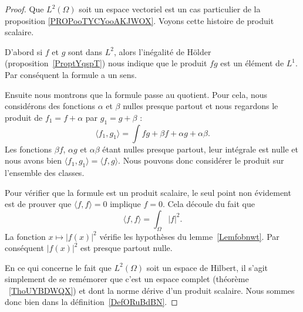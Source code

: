 \begin{proof}
    Que \( L^2(\Omega)\) soit un espace vectoriel est un cas particulier de la proposition \ref{PROPooTYCYooAKJWOX}. Voyons cette histoire de produit scalaire.

    D'abord si \( f\) et \( g\) sont dans \( L^2\), alors l'inégalité de Hölder (proposition~\ref{ProptYqspT}) nous indique que le produit \( fg\) est un élément de \( L^1\). Par conséquent la formule a un sens.

    Ensuite nous montrons que la formule passe au quotient. Pour cela, nous considérons des fonctions \( \alpha\) et \( \beta\) nulles presque partout et nous regardons le produit de \( f_1=f+\alpha\) par \( g_1=g+\beta\) :
    \begin{equation}
        \langle f_1, g_1\rangle =\int fg+\beta f+\alpha g+ \alpha\beta.
    \end{equation}
    Les fonctions \( \beta f\), \( \alpha g\) et \( \alpha\beta\) étant nulles presque partout, leur intégrale est nulle et nous avons bien \( \langle f_1, g_1\rangle =\langle f,g \rangle \). Nous pouvons donc considérer le produit sur l'ensemble des classes.

    Pour vérifier que la formule est un produit scalaire, le seul point non évidement est de prouver que \( \langle f, f\rangle =0\) implique \( f=0\). Cela découle du fait que
    \begin{equation}
        \langle f, f\rangle =\int_{\Omega}| f |^2.
    \end{equation}
    La fonction \( x\mapsto | f(x) |^2\) vérifie les hypothèses du lemme~\ref{Lemfobnwt}. Par conséquent \( | f(x) |^2\) est presque partout nulle.

    En ce qui concerne le fait que \( L^2(\Omega)\) soit un espace de Hilbert, il s'agit simplement de se remémorer que c'est un espace complet (théorème ~\ref{ThoUYBDWQX}) et dont la norme dérive d'un produit scalaire. Nous sommes donc bien dans la définition~\ref{DefORuBdBN}.
\end{proof}

